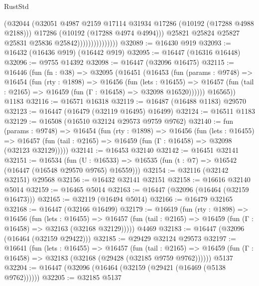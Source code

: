 \begin{lexlean}{RustStd}
\begin{coremodule}
                                  (@32044
                                    (@32051
                                      @4987
                                      @2159
                                      @17114
                                      @31934
                                      @17286
                                      (@10192 (@17288 @4988 @2188)))
                                    @17286
                                    (@10192 (@17288 @4974 @4994)))
                                  @25821
                                  @25824
                                  @25827
                                  @25831
                                  @25836
                                  @25842)))))))))))))))
@32089 := @16430 @919
@32093 := @16432 (@16436 @919) (@16442 @919)
@32095 := @16447 (@16316 @16448)
@32096 := @9755 @14392
@32098 := @16447 (@32096 @16475)
@32115 := @16446
    (fun (fn : @38) =>
    @32095
      (@16451
        (@16453
          (fun (params : @9748) =>
          @16454
            (fun (rty : @1898) =>
            @16456
              (fun (lets : @16455) =>
              @16457 (fun (tail : @2165) => @16459 (fun (Γ : @16458) => @32098 @16520))))))
        @16565))
    @1183
@32116 := @16571 @16318
@32119 := @16487 (@16488 @1183) @29570
@32123 := @16447 (@16479 (@32119 @16495) @16499)
@32124 := @16511 @1183
@32129 := @16508 (@16510 @32124 @29573 @9759 @9762)
@32140 := fun (params : @9748) =>
  @16454
    (fun (rty : @1898) =>
    @16456
      (fun (lets : @16455) =>
      @16457 (fun (tail : @2165) => @16459 (fun (Γ : @16458) => @32098 (@32123 @32129)))))
@32141 := @16453 @32140
@32142 := @16451 @32141
@32151 := @16534
    (fun (U : @16533) => @16535 (fun (t : @7) => @16542 (@16447 (@16548 @29570 @9765) @16559)))
@32154 := @32116 (@32142 @32151) @29568
@32156 := @16432 @32141 @32151
@32158 := @16616 @32140 @5014
@32159 := @16465 @5014
@32163 := @16447 (@32096 (@16464 (@32159 @16473)))
@32165 := @32119 (@16494 @5014)
@32166 := @16479 @32165
@32168 := @16447 (@32166 @16499)
@32179 := @16619
    (fun (rty : @1898) =>
    @16456
      (fun (lets : @16455) =>
      @16457 (fun (tail : @2165) => @16459 (fun (Γ : @16458) => @32163 (@32168 @32129)))))
    @4469
@32183 := @16447 (@32096 (@16464 (@32159 @29422)))
@32185 := @29429 @32124 @29573
@32197 := @16641
    (fun (lets : @16455) =>
    @16457
      (fun (tail : @2165) =>
      @16459 (fun (Γ : @16458) => @32183 (@32168 (@29428 (@32185 @9759 @9762))))))
    @5137
@32204 := @16447 (@32096 (@16464 (@32159 (@29421 (@16469 (@5138 @9762))))))
@32205 := @32185 @5137

\end{coremodule}
\end{lexlean}

